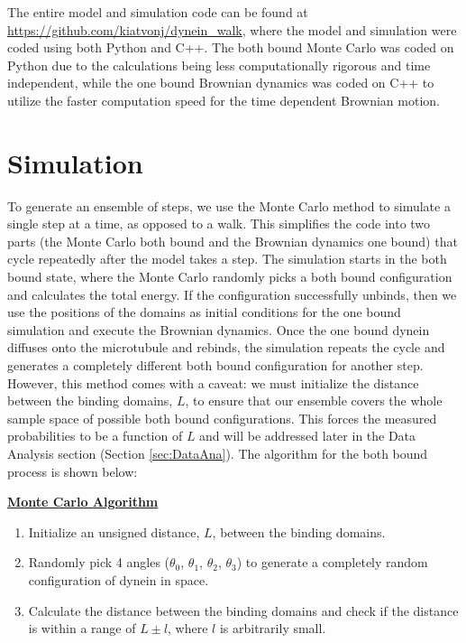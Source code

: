
The entire model and simulation code can be found at \url{https://github.com/kiatvonj/dynein_walk}, where the model and simulation were coded using both Python and C++. The both bound Monte Carlo was coded on Python due to the calculations being less computationally rigorous and time independent, while the one bound Brownian dynamics was coded on C++ to utilize the faster computation speed for the time  dependent Brownian motion.

\section{Simulation}
To generate an ensemble of steps, we use the Monte Carlo method to simulate a single step at a time, as opposed to a walk. This simplifies the code into two parts (the Monte Carlo both bound and the Brownian dynamics one bound) that cycle repeatedly after the model takes a step. The simulation starts in the both bound state, where the Monte Carlo randomly picks a both bound configuration and calculates the total energy. If the configuration successfully unbinds, then we use the positions of the domains as initial conditions for the one bound simulation and execute the Brownian dynamics. Once the one bound dynein diffuses onto the microtubule and rebinds, the simulation repeats the cycle and generates a completely different both bound configuration for another step. However, this method comes with a caveat: we must initialize the distance between the binding domains, $L$, to ensure that our ensemble covers the whole sample space of possible both bound configurations. This forces the measured probabilities to be a function of $L$ and will be addressed later in the Data Analysis section (Section \ref{sec:DataAna}). The algorithm for the both bound process is shown below:

\newpage
\begin{center}\label{alg:MonteCarlo}
	\textbf{\underline{Monte Carlo Algorithm}}
\end{center}


\begin{enumerate}
	\item Initialize an unsigned distance, $L$, between the binding domains.
	
	\item Randomly pick 4 angles ($\theta_0$, $\theta_1$, $\theta_2$, $\theta_3$) to generate a completely random configuration of dynein in space.
	
	\item Calculate the distance between the binding domains and check if the distance is within a range of $L\pm l$, where $l$ is arbitrarily small.
\end{enumerate}

